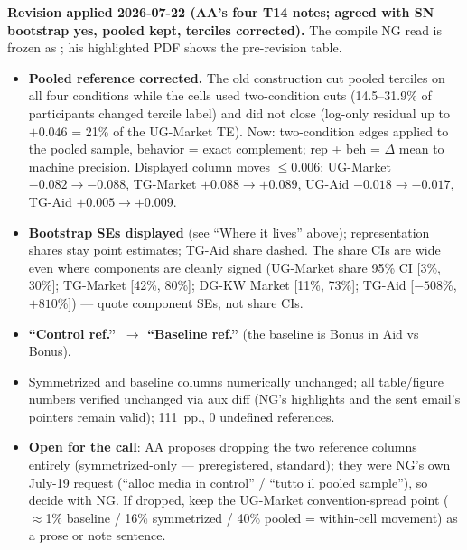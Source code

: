 \documentclass[11pt]{article}
\newcommand{\code}[1]{\path{#1}}
\begin{document}
\textbf{Revision applied 2026-07-22 (AA's four T14 notes; agreed with SN --- bootstrap yes, pooled kept, terciles corrected).} The compile NG read is frozen as \code{main_v2.tex}; his highlighted PDF shows the pre-revision table.
\begin{itemize}
\item \textbf{Pooled reference corrected.} The old construction cut pooled terciles on all four conditions while the cells used two-condition cuts (14.5--31.9\% of participants changed tercile label) and did not close (log-only residual up to $+0.046$ = 21\% of the UG-Market TE). Now: two-condition edges applied to the pooled sample, behavior = exact complement; rep + beh = $\Delta$ mean to machine precision. Displayed column moves $\le 0.006$: UG-Market $-0.082 \to -0.088$, TG-Market $+0.088 \to +0.089$, UG-Aid $-0.018 \to -0.017$, TG-Aid $+0.005 \to +0.009$.
\item \textbf{Bootstrap SEs displayed} (see ``Where it lives'' above); representation shares stay point estimates; TG-Aid share dashed. The share CIs are wide even where components are cleanly signed (UG-Market share 95\% CI [3\%, 30\%]; TG-Market [42\%, 80\%]; DG-KW Market [11\%, 73\%]; TG-Aid [$-508$\%, $+810$\%]) --- quote component SEs, not share CIs.
\item \textbf{``Control ref.''\ $\to$ ``Baseline ref.''} (the baseline is Bonus in Aid vs Bonus).
\item Symmetrized and baseline columns numerically unchanged; all table/figure numbers verified unchanged via aux diff (NG's highlights and the sent email's pointers remain valid); \code{main.tex} 111~pp., 0 undefined references.
\item \textbf{Open for the call}: AA proposes dropping the two reference columns entirely (symmetrized-only --- preregistered, standard); they were NG's own July-19 request (``alloc media in control'' / ``tutto il pooled sample''), so decide with NG\@. If dropped, keep the UG-Market convention-spread point ($\approx$1\% baseline / 16\% symmetrized / 40\% pooled = within-cell movement) as a prose or note sentence.
\end{itemize}
\end{document}
